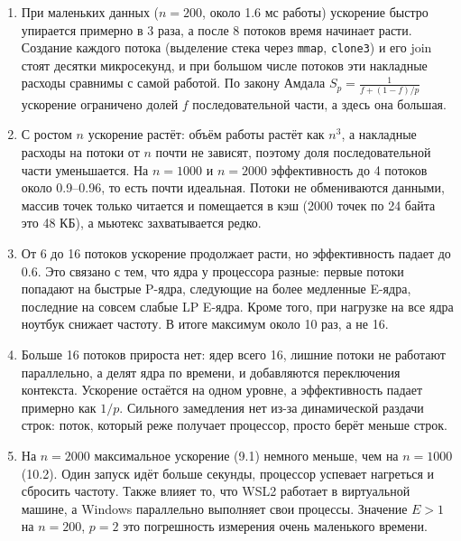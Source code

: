 \begin{enumerate}
\item При маленьких данных ($n = 200$, около 1.6 мс работы) ускорение быстро упирается примерно в 3 раза, а после 8 потоков время начинает расти. Создание каждого потока (выделение стека через \texttt{mmap}, \texttt{clone3}) и его join стоят десятки микросекунд, и при большом числе потоков эти накладные расходы сравнимы с самой работой. По закону Амдала $S_p = \frac{1}{f + (1-f)/p}$ ускорение ограничено долей $f$ последовательной части, а здесь она большая.
\item С ростом $n$ ускорение растёт: объём работы растёт как $n^3$, а накладные расходы на потоки от $n$ почти не зависят, поэтому доля последовательной части уменьшается. На $n = 1000$ и $n = 2000$ эффективность до 4 потоков около 0.9--0.96, то есть почти идеальная. Потоки не обмениваются данными, массив точек только читается и помещается в кэш (2000 точек по 24 байта это 48 КБ), а мьютекс захватывается редко.
\item От 6 до 16 потоков ускорение продолжает расти, но эффективность падает до 0.6. Это связано с тем, что ядра у процессора разные: первые потоки попадают на быстрые P-ядра, следующие на более медленные E-ядра, последние на совсем слабые LP E-ядра. Кроме того, при нагрузке на все ядра ноутбук снижает частоту. В итоге максимум около 10 раз, а не 16.
\item Больше 16 потоков прироста нет: ядер всего 16, лишние потоки не работают параллельно, а делят ядра по времени, и добавляются переключения контекста. Ускорение остаётся на одном уровне, а эффективность падает примерно как $1/p$. Сильного замедления нет из-за динамической раздачи строк: поток, который реже получает процессор, просто берёт меньше строк.
\item На $n = 2000$ максимальное ускорение (9.1) немного меньше, чем на $n = 1000$ (10.2). Один запуск идёт больше секунды, процессор успевает нагреться и сбросить частоту. Также влияет то, что WSL2 работает в виртуальной машине, а Windows параллельно выполняет свои процессы. Значение $E > 1$ на $n = 200$, $p = 2$ это погрешность измерения очень маленького времени.
\end{enumerate}
